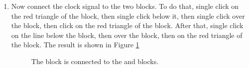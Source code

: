\begin{enumerate}
\item
  Now connect the clock signal to the two blocks. To do that, single
  click on the red triangle of the  block, then single
  click below it, then single click over the  block, then
  click on the red triangle of the  block. After that,
  single click on the line below the  block, then over
  the  block, then on the red triangle of the 
  block. The result is shown in Figure \ref{fig:redlink}

%
\begin{figure}[htb]
\caption{The  block is connected to the  and
 blocks.}
\label{fig:redlink}
\end{figure}


\end{enumerate}
